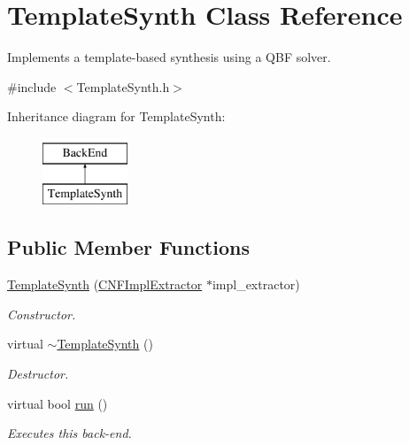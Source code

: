 \hypertarget{classTemplateSynth}{\section{Template\-Synth Class Reference}
\label{classTemplateSynth}
}


Implements a template-\/based synthesis using a Q\-B\-F solver.  




{\ttfamily \#include $<$Template\-Synth.\-h$>$}

Inheritance diagram for Template\-Synth\-:\begin{figure}[H]
\begin{center}
\leavevmode
\includegraphics[height=2.000000cm]{classTemplateSynth}
\end{center}
\end{figure}
\subsection*{Public Member Functions}
\begin{DoxyCompactItemize}
\item 
\hyperlink{classTemplateSynth_a56d5f285781e5871bf391acc38acb0aa}{Template\-Synth} (\hyperlink{classCNFImplExtractor}{C\-N\-F\-Impl\-Extractor} $\ast$impl\-\_\-extractor)
\begin{DoxyCompactList}\small\item\em Constructor. \end{DoxyCompactList}\item 
virtual \hyperlink{classTemplateSynth_a5d540c9d4dc6696b53768a27ac74c569}{$\sim$\-Template\-Synth} ()
\begin{DoxyCompactList}\small\item\em Destructor. \end{DoxyCompactList}\item 
virtual bool \hyperlink{classTemplateSynth_a5ad9855736c7d4dfdec08280d2424f80}{run} ()
\begin{DoxyCompactList}\small\item\em Executes this back-\/end. \end{DoxyCompactList}\end{DoxyCompactItemize}
